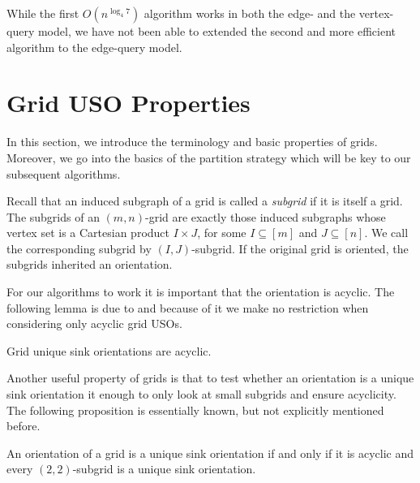 \documentclass[runningheads,a4paper]{llncs}
\newcommand{\JN}[1]{\marginpar{\parbox{3.6cm}{{\small {\bf JN:} #1}}}} %
\begin{document}
While the first $O(n^{\log_4 7})$ algorithm works in both the edge- and the vertex-query model, we have not been able to extended the second and more efficient algorithm to the edge-query model.


\section{Grid USO Properties}\label{section:grid_uso_properties}
In this section, we introduce the terminology and basic properties of grids. Moreover, we go into the basics of the partition strategy which will be key to our subsequent algorithms.


Recall that an induced subgraph of a grid is called a \emph{subgrid} if it is itself a grid.
The subgrids of an $(m,n)$-grid are exactly those induced subgraphs whose vertex set is a
Cartesian product $I \times J$, for some $I \subseteq [m]$ and $J \subseteq [n]$. We call the corresponding subgrid by $(I,J)$-subgrid.
If the original grid is oriented, the subgrids inherited an orientation.

For our algorithms to work it is important that the orientation is acyclic. The following lemma is due to \citet{grid08} and because of it we make no restriction when considering only acyclic grid USOs. 

\begin{lemma}
\label{lemma:acyclicity_lemma}
 Grid unique sink orientations are acyclic.
\end{lemma}

Another useful property of grids is that to test whether an orientation is a unique sink orientation it enough to only look at small subgrids and ensure acyclicity. The following proposition is essentially known, but not explicitly mentioned before. 

\begin{proposition}
\label{prop:subgrid_uso_check}
 An orientation of a grid is a unique sink orientation if and only if it is acyclic and every $(2, 2)$-subgrid is a unique sink orientation.
\end{proposition}
\end{document}
